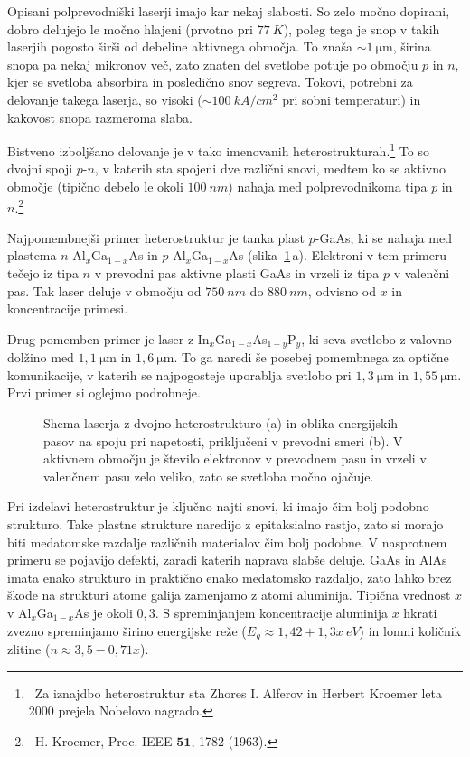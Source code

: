 Opisani polprevodniški laserji imajo kar nekaj slabosti. So zelo močno dopirani, 
dobro delujejo le močno hlajeni (prvotno pri $77~\si{K}$), poleg tega je snop 
v takih laserjih pogosto širši od debeline aktivnega območja. To znaša
$\sim 1~\si{\micro\meter}$, širina snopa pa nekaj mikronov več, zato
znaten del svetlobe potuje po območju $p$ in $n$, kjer se svetloba absorbira in posledično
snov segreva. Tokovi, potrebni za 
delovanje takega laserja, so visoki ($\sim 100~\si{kA}/\si{cm}^2$ pri sobni temperaturi) in
kakovost snopa razmeroma slaba. 

Bistveno izboljšano delovanje je v tako imenovanih 
heterostrukturah.\footnote{~Za 
iznajdbo heterostruktur sta Zhores I. Alferov in Herbert Kroemer leta 2000 prejela Nobelovo nagrado.}
 To so dvojni spoji $p$-$n$, 
v katerih sta spojeni dve različni snovi, medtem ko se aktivno območje (tipično debelo le okoli $100~\si{nm}$) 
nahaja med polprevodnikoma tipa $p$ in $n$.\footnote{~H. Kroemer, Proc. IEEE $\mathbf{51}$, 1782 (1963).}

Najpomembnejši primer heterostruktur je tanka plast $p$-GaAs, ki se nahaja med plastema  
$n$-Al$_x$Ga$_{1-x}$As in $p$-Al$_x$Ga$_{1-x}$As 
(slika~\ref{fig:hetero}\,a). Elektroni v tem primeru tečejo iz tipa $n$ v prevodni pas aktivne plasti
GaAs in vrzeli iz tipa $p$ v valenčni pas. 
Tak laser deluje v območju od $750~\si{nm}$ do $880~\si{nm}$, odvisno od $x$ in koncentracije primesi.

Drug pomemben primer je laser z In$_{x}$Ga$_{1-x}$As$_{1-y}$P$_y$, ki seva svetlobo z valovno 
dolžino med $1,1~\si{\micro\metre}$ in $1,6~\si{\micro\metre}$. To ga naredi še posebej pomembnega za optične
komunikacije, v katerih se najpogosteje uporablja svetlobo pri $1,3~\si{\micro\meter}$ in $1,55~\si{\micro\meter}$. 
Prvi primer si oglejmo podrobneje.
\begin{figure}[ht]
\centering
\def\svgwidth{128truemm} 

\caption{Shema laserja z dvojno heterostrukturo (a) in oblika energijskih pasov 
na spoju pri napetosti, priključeni v prevodni smeri (b). V aktivnem območju
je število elektronov v prevodnem pasu in vrzeli v valenčnem pasu zelo veliko, zato se 
svetloba močno ojačuje.
}
\label{fig:hetero}
\end{figure}
\begin{remark}
Pri izdelavi heterostruktur je ključno najti snovi, ki imajo čim bolj podobno strukturo.
Take plastne strukture naredijo z epitaksialno rastjo, zato si morajo biti medatomske
razdalje različnih materialov čim bolj podobne. V nasprotnem primeru se pojavijo 
defekti, zaradi katerih naprava slabše deluje. 
GaAs in AlAs imata enako strukturo in praktično enako medatomsko razdaljo, zato 
lahko brez škode na strukturi atome galija zamenjamo z atomi aluminija. Tipična 
vrednost $x$ v Al$_x$Ga$_{1-x}$As je okoli $0,3$. S spreminjanjem koncentracije aluminija $x$ hkrati
zvezno spreminjamo širino energijske reže ($E_g \approx 1,42 + 1,3x~\si{eV}$) in lomni količnik 
zlitine ($n \approx 3,5-0,71x$).
\end{remark}

